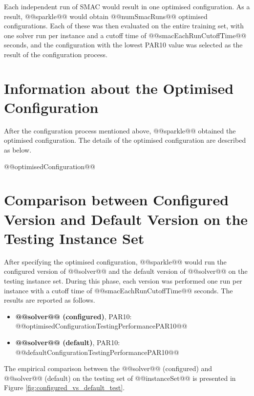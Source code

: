 \documentclass[british]{article}
\begin{document}
Each independent run of SMAC would result in one optimised configuration. As a result, @@sparkle@@ would obtain @@numSmacRuns@@ optimised configurations. Each of these was then evaluated on the entire training set, with one solver run per instance and a cutoff time of @@smacEachRunCutoffTime@@ seconds, and the configuration with the lowest PAR10 value was selected as the result of the configuration process.

\section{Information about the Optimised Configuration}

After the configuration process mentioned above, @@sparkle@@ obtained the optimised configuration. The details of the optimised configuration are described as below.

\vspace{5mm}

@@optimisedConfiguration@@

\vspace{5mm}


\section{Comparison between Configured Version and Default Version on the Testing Instance Set}

After specifying the optimised configuration, @@sparkle@@ would run the configured version of @@solver@@ and the default version of @@solver@@ on the testing instance set. During this phase, each version was performed one run per instance with a cutoff time of @@smacEachRunCutoffTime@@ seconds. The results are reported as follows.

\begin{itemize}
\item \textbf{@@solver@@ (configured)}, PAR10: @@optimisedConfigurationTestingPerformancePAR10@@
\item \textbf{@@solver@@ (default)}, PAR10: @@defaultConfigurationTestingPerformancePAR10@@
\end{itemize}

The empirical comparison between the @@solver@@ (configured) and @@solver@@ (default) on the testing set of @@instanceSet@@ is presented in Figure \ref{fig:configured_vs_default_test}.
\end{document}
